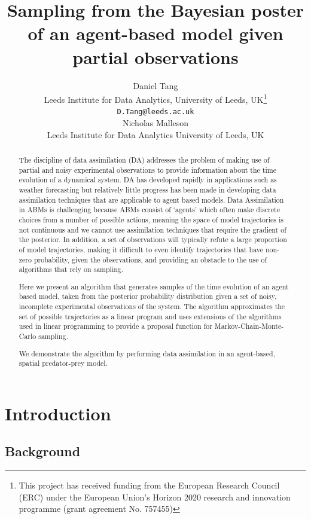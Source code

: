\documentclass{article}
\title{Sampling from the Bayesian poster of an agent-based model given partial observations}
\author{
  Daniel Tang\\
    Leeds Institute for Data Analytics, University of Leeds, UK\thanks{This project has received funding from the European Research Council (ERC) under the European Union’s Horizon 2020 research and innovation programme (grant agreement No. 757455)}\\
  \texttt{D.Tang@leeds.ac.uk}\\
  \AND
  Nicholas Malleson\\
  Leeds Institute for Data Analytics University of Leeds, UK\\  
}
\begin{document}
\maketitle

\begin{abstract}
The discipline of data assimilation (DA) addresses the problem of making use of partial and noisy experimental observations to provide information about the time evolution of a dynamical system. DA has developed rapidly in applications such as weather forecasting \cite{kalnay_atmospheric_2003} but relatively little progress has been made in developing data assimilation techniques that are applicable to agent based models. Data Assimilation in ABMs is challenging because ABMs consist of `agents' which often make discrete choices from a number of possible actions, meaning the space of model trajectories is not continuous and we cannot use assimilation techniques that require the gradient of the posterior. In addition, a set of observations will typically refute a large proportion of model trajectories, making it difficult to even identify trajectories that have non-zero probability, given the observations, and providing an obstacle to the use of algorithms that rely on sampling.

Here we present an algorithm that generates samples of the time evolution of an agent based model, taken from the posterior probability distribution given a set of noisy, incomplete experimental observations of the system. The algorithm approximates the set of possible trajectories as a linear program and uses extensions of the algorithms used in linear programming to provide a proposal function for Markov-Chain-Monte-Carlo sampling.

We demonstrate the algorithm by performing data assimilation in an agent-based, spatial predator-prey model.
\end{abstract}


\section{Introduction}

\subsection{Background}\label{sec:background}
\end{document}
